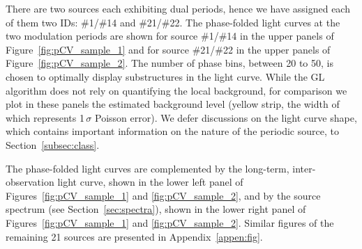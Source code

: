 \documentclass[fleqn,usenatbib]{mnras}
\begin{document}
There are two sources each exhibiting dual periods, hence we have assigned each of them two IDs: \#1/\#14 and \#21/\#22.  
The phase-folded light curves at the two modulation periods are shown for source \#1/\#14 in the upper panels of  Figure~\ref{fig:pCV_sample_1} and for source \#21/\#22 in the upper panels of Figure~\ref{fig:pCV_sample_2}. 
The number of phase bins, between 20 to 50, is chosen to optimally display substructures in the light curve. While the GL algorithm does not rely on quantifying the local background, for comparison we plot in these panels the estimated background level (yellow strip, the width of which represents 1\,$\sigma$ Poisson error). 
We defer discussions on the light curve shape, which contains important information on the nature of the periodic source, to Section~\ref{subsec:class}. 
 
The phase-folded light curves are complemented by the long-term, inter-observation light curve, shown in the lower left panel of Figures~\ref{fig:pCV_sample_1} and \ref{fig:pCV_sample_2}, 
and by the source spectrum (see Section~\ref{sec:spectra}),
shown in the lower right panel of Figures~\ref{fig:pCV_sample_1} and \ref{fig:pCV_sample_2}. 
Similar figures of the remaining 21 sources are presented in Appendix~\ref{appen:fig}.
\end{document}
